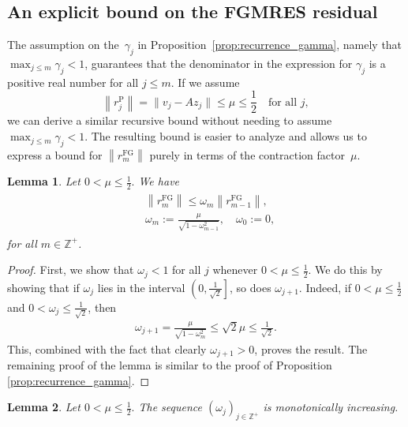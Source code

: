\documentclass[10pt,a4paper]{amsart}
\newtheorem{lemma}{Lemma}
\def\Z{\mathbb{Z}}
\begin{document}
\subsection{An explicit bound on the FGMRES residual}
The assumption on the~$\gamma_j$ in Proposition~\ref{prop:recurrence_gamma}, namely that $\max_{j \leq m} \gamma_{j} < 1$, guarantees that the denominator in the expression for $\gamma_{j}$ is a positive real number for all $j \leq m$. If we assume 
\[
\left\|r_j^{\mathrm{P}}\right\| = \| v_j - A z_j \| \leq \mu \leq \frac{1}{2} \quad \text{for all $j$},
\]
we can derive a similar recursive bound without needing to assume $\max_{j \leq m} \gamma_{j} < 1$. The resulting bound is easier to analyze and allows us to express a bound for $\left\|r_m^{\mathrm{FG}}\right\|$ purely in terms of the contraction factor~$\mu$.
\begin{lemma} \label{prop:recurrence}
    Let $0 < \mu \leq \frac{1}{2}.$ We have 
    \begin{align}
        \begin{aligned} \label{eq:successive_rG}
             & \left\|r_m^{\mathrm{FG}}\right\| \leq \omega_m \left\|r_{m-1}^{\mathrm{FG}}\right\|, \\
             & \omega_m := \frac{\mu}{\sqrt{1-\omega_{m-1}^2}}, \quad \omega_0 := 0,
        \end{aligned}
    \end{align}
    for all $m \in \Z^+$. 
\end{lemma}
\begin{proof}
    First, we show that $\omega_{j} < 1$ for all $j$ whenever $0 < \mu \leq \frac{1}{2}.$ We do this by showing that if $\omega_j$ lies in the interval $\left(0, \frac{1}{\sqrt{2}}\right]$, so does $\omega_{j+1}$. Indeed, if $0 < \mu \leq \frac{1}{2}$ and $0 < \omega_{j} \leq \frac{1}{\sqrt{2}}$, then
    \begin{align*}
       \omega_{j+1} = \frac{\mu}{\sqrt{1-\omega_{m}^2}} \leq \sqrt{2} \mu \leq \frac{1}{\sqrt{2}}.
    \end{align*}
    This, combined with the fact that clearly $\omega_{j+1} > 0$, proves the result. The remaining proof of the lemma is similar to the proof of Proposition \ref{prop:recurrence_gamma}.
\end{proof}

\begin{lemma} \label{lem:monotonic_omega}
 Let $0 < \mu \leq \frac{1}{2}.$ The sequence $(\omega_j)_{j \in \Z^+}$ is monotonically increasing.
\end{lemma}
\end{document}
